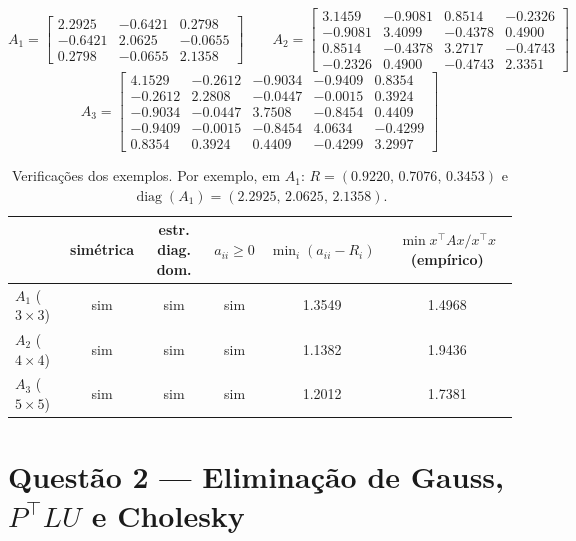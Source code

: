 \documentclass{article}
\newcommand{\T}{^{\top}}
\theoremstyle{remark}
\begin{document}
\[
A_1=\begin{bmatrix}
2.2925 & -0.6421 & 0.2798 \\
-0.6421 & 2.0625 & -0.0655 \\
0.2798 & -0.0655 & 2.1358
\end{bmatrix}
\qquad
A_2=\begin{bmatrix}
3.1459 & -0.9081 & 0.8514 & -0.2326 \\
-0.9081 & 3.4099 & -0.4378 & 0.4900 \\
0.8514 & -0.4378 & 3.2717 & -0.4743 \\
-0.2326 & 0.4900 & -0.4743 & 2.3351
\end{bmatrix}
\]
\[
A_3=\begin{bmatrix}
4.1529 & -0.2612 & -0.9034 & -0.9409 & 0.8354 \\
-0.2612 & 2.2808 & -0.0447 & -0.0015 & 0.3924 \\
-0.9034 & -0.0447 & 3.7508 & -0.8454 & 0.4409 \\
-0.9409 & -0.0015 & -0.8454 & 4.0634 & -0.4299 \\
0.8354 & 0.3924 & 0.4409 & -0.4299 & 3.2997
\end{bmatrix}
\]

\begin{table}[H]\centering\small
\begin{tabular}{@{}lccccc@{}}\toprule
 & simétrica & estr. diag. dom. & $a_{ii}\ge0$ & $\min_i(a_{ii}-R_i)$ & $\min x\T Ax/x\T x$ (empírico)\\\midrule
$A_1$ ($3\times3$) & sim & sim & sim & 1.3549 & 1.4968\\
$A_2$ ($4\times4$) & sim & sim & sim & 1.1382 & 1.9436\\
$A_3$ ($5\times5$) & sim & sim & sim & 1.2012 & 1.7381\\\bottomrule
\end{tabular}
\caption{Verificações dos exemplos. Por exemplo, em $A_1$: $R=(0.9220,\,0.7076,\,0.3453)$ e
$\operatorname{diag}(A_1)=(2.2925,\,2.0625,\,2.1358)$.}
\end{table}

\section{Questão 2 --- Eliminação de Gauss, $P\T LU$ e Cholesky}
\end{document}
